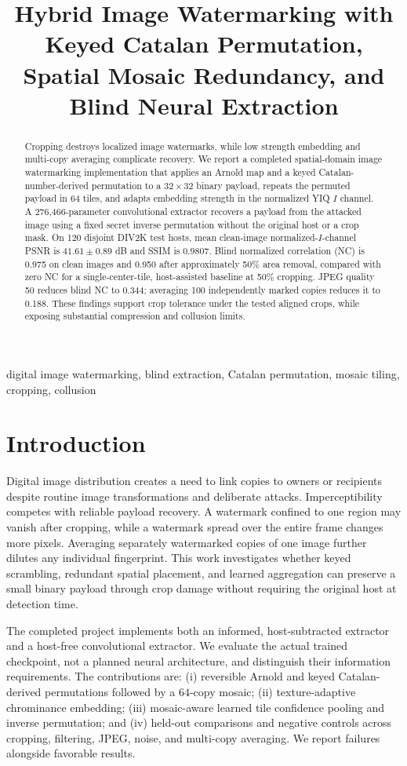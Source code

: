 \documentclass[conference]{IEEEtran}
\title{Hybrid Image Watermarking with Keyed Catalan Permutation, Spatial Mosaic Redundancy, and Blind Neural Extraction}
\author{\IEEEauthorblockN{Neerav Aiyappa Mukkatira, Mevin Jose, MS Ananthesha, Niranjan S Achar}
\IEEEauthorblockA{Department of Computer Science and Engineering, PES University, Bengaluru, India\\
Capstone project PW26\_PAC\_01; guided by Prof. Pavan A C}}
\begin{document}
\maketitle
\begin{abstract}
Cropping destroys localized image watermarks, while low strength embedding and multi-copy averaging complicate recovery. We report a completed spatial-domain image watermarking implementation that applies an Arnold map and a keyed Catalan-number-derived permutation to a $32\times32$ binary payload, repeats the permuted payload in 64 tiles, and adapts embedding strength in the normalized YIQ $I$ channel. A 276,466-parameter convolutional extractor recovers a payload from the attacked image using a fixed secret inverse permutation without the original host or a crop mask. On 120 disjoint DIV2K test hosts, mean clean-image normalized-$I$-channel PSNR is $41.61\pm0.89$ dB and SSIM is $0.9807$. Blind normalized correlation (NC) is 0.975 on clean images and 0.950 after approximately 50\% area removal, compared with zero NC for a single-center-tile, host-assisted baseline at 50\% cropping. JPEG quality 50 reduces blind NC to 0.344; averaging 100 independently marked copies reduces it to 0.188. These findings support crop tolerance under the tested aligned crops, while exposing substantial compression and collusion limits.
\end{abstract}
\begin{IEEEkeywords}digital image watermarking, blind extraction, Catalan permutation, mosaic tiling, cropping, collusion
\end{IEEEkeywords}
\section{Introduction}
Digital image distribution creates a need to link copies to owners or recipients despite routine image transformations and deliberate attacks. Imperceptibility competes with reliable payload recovery. A watermark confined to one region may vanish after cropping, while a watermark spread over the entire frame changes more pixels. Averaging separately watermarked copies of one image further dilutes any individual fingerprint. This work investigates whether keyed scrambling, redundant spatial placement, and learned aggregation can preserve a small binary payload through crop damage without requiring the original host at detection time.

The completed project implements both an informed, host-subtracted extractor and a host-free convolutional extractor. We evaluate the actual trained checkpoint, not a planned neural architecture, and distinguish their information requirements. The contributions are: (i) reversible Arnold and keyed Catalan-derived permutations followed by a $64$-copy mosaic; (ii) texture-adaptive chrominance embedding; (iii) mosaic-aware learned tile confidence pooling and inverse permutation; and (iv) held-out comparisons and negative controls across cropping, filtering, JPEG, noise, and multi-copy averaging. We report failures alongside favorable results.
\end{document}
